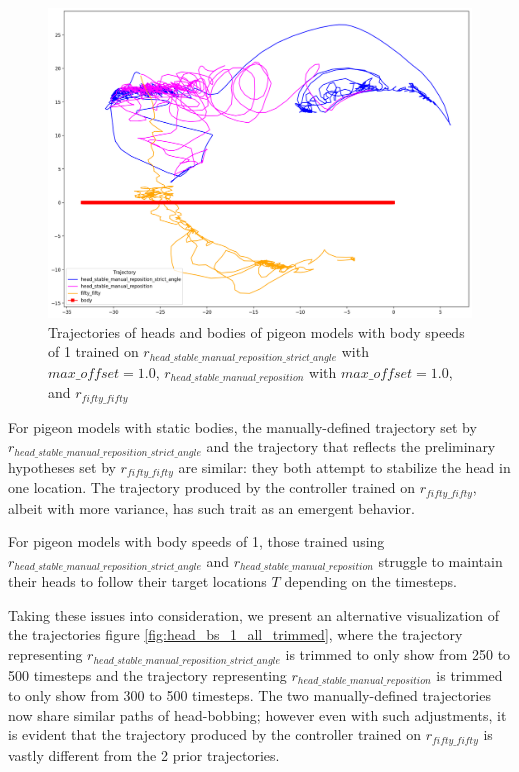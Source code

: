   \begin{figure}[H]
      \centering
      \includegraphics[width=1\textwidth]{figures/head_tracking_results/pigeon_bs_1_all.png}
      \caption{Trajectories of heads and bodies of pigeon models with body speeds of 1 trained on $r_{head\_stable\_manual\_reposition\_strict\_angle}$ with $max\_offset = 1.0$, $r_{head\_stable\_manual\_reposition}$ with $max\_offset = 1.0$, and $r_{fifty\_fifty}$}
      \label{fig:head_bs_1_all}
  \end{figure}

  For pigeon models with static bodies, the manually-defined trajectory set by $r_{head\_stable\_manual\_reposition\_strict\_angle}$ and the trajectory that reflects the preliminary hypotheses set by $r_{fifty\_fifty}$ are similar: they both attempt to stabilize the head in one location. The trajectory produced by the controller trained on $r_{fifty\_fifty}$, albeit with more variance, has such trait as an emergent behavior.

  For pigeon models with body speeds of 1, those trained using $r_{head\_stable\_manual\_reposition\_strict\_angle}$ and $r_{head\_stable\_manual\_reposition}$ struggle to maintain their heads to follow their target locations $T$ depending on the timesteps.

  Taking these issues into consideration, we present an alternative visualization of the trajectories figure \ref{fig:head_bs_1_all_trimmed}, where the trajectory representing $r_{head\_stable\_manual\_reposition\_strict\_angle}$ is trimmed to only show from 250 to 500 timesteps and the trajectory representing $r_{head\_stable\_manual\_reposition}$ is trimmed to only show from 300 to 500 timesteps.
  The two manually-defined trajectories now share similar paths of head-bobbing; however even with such adjustments, it is evident that the trajectory produced by the controller trained on $r_{fifty\_fifty}$ is vastly different from the 2 prior trajectories.

